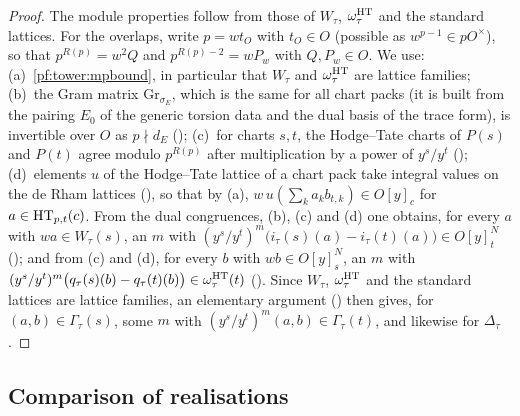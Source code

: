 \begin{proof}
The module properties follow from those of $W_\tau$, $\omega^{\mathrm{HT}}_\tau$ and the standard lattices. For the overlaps, write
$p=wt_O$ with $t_O\in O$ (possible as $w^{p-1}\in pO^\times$), so that $p^{R(p)}=w^2Q$ and $p^{R(p)-2}=wP_w$ with
$Q,P_w\in O$. We use: (a)~\cref{pf:tower:mpbound}, in particular that $W_\tau$ and $\omega^{\mathrm{HT}}_\tau$ are lattice families;
(b)~the Gram matrix $\mathrm{Gr}_{\sigma_E}$, which is the same for all chart packs (it is built from the pairing $E_0$ of the generic
torsion data and the dual basis of the trace form), is invertible over $O$ as $p\nmid d_E$
(); (c)~for charts $s,t$, the Hodge--Tate charts of $P(s)$ and $P(t)$
agree modulo $p^{R(p)}$ after multiplication by a power of $y^s/y^t$
(); (d)~elements $u$ of the Hodge--Tate lattice of a chart pack take
integral values on the de Rham lattices (), so that by (a),
$w\,u(\sum_ka_kb_{t,k})\in O[y]_c$ for $a\in\mathrm{HT}_{p,t}(c)$. From the dual congruences, (b), (c) and (d) one obtains, for every
$a$ with $wa\in W_\tau(s)$, an $m$ with $(y^s/y^t)^m\bigl(i_\tau(s)(a)-i_\tau(t)(a)\bigr)\in O[y]_t^N$
(); and from (c) and (d), for every $b$ with
$wb\in O[y]_s^N$, an $m$ with $(y^s/y^t)^m\bigl(q_\tau(s)(b)-q_\tau(t)(b)\bigr)\in\omega^{\mathrm{HT}}_\tau(t)$
(). Since $W_\tau$, $\omega^{\mathrm{HT}}_\tau$ and the standard
lattices are lattice families, an elementary argument
() then gives, for $(a,b)\in\Gamma_\tau(s)$, some $m$
with $(y^s/y^t)^m(a,b)\in\Gamma_\tau(t)$, and likewise for $\Delta_\tau$.
\end{proof}

\subsection{Comparison of realisations}\label{pf:tower:sec-cs}

